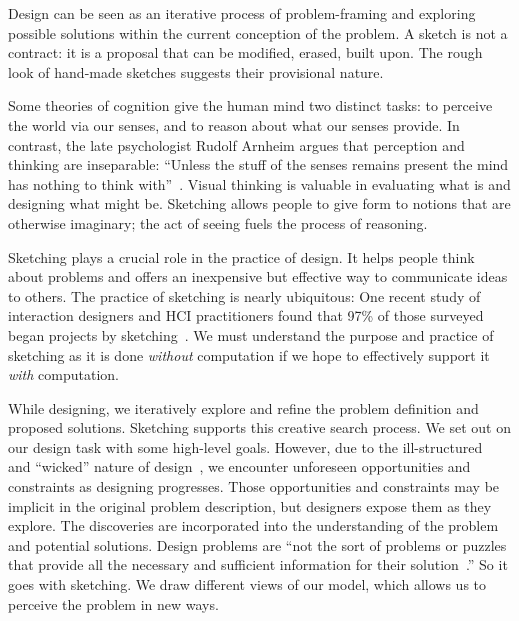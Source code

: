 Design can be seen as an iterative process of problem-framing and
exploring possible solutions within the current conception of the
problem. A sketch is not a contract: it is a proposal that can be
modified, erased, built upon. The rough look of hand-made sketches
suggests their provisional nature.

Some theories of cognition give the human mind two distinct tasks: to
perceive the world via our senses, and to reason about what our senses
provide. In contrast, the late psychologist Rudolf Arnheim argues that
perception and thinking are inseparable: ``Unless the stuff of the
senses remains present the mind has nothing to think
with''~\cite{arnheim-visthink}. Visual thinking is valuable in
evaluating what is and designing what might be. Sketching allows
people to give form to notions that are otherwise imaginary; the act
of seeing fuels the process of reasoning.

Sketching plays a crucial role in the practice of design. It helps
people think about problems and offers an inexpensive but effective
way to communicate ideas to others. The practice of sketching is
nearly ubiquitous: One recent study of interaction designers and HCI
practitioners found that 97\% of those surveyed began projects by
sketching~\cite{myers-behavior-design}. We must understand the purpose
and practice of sketching as it is done \textit{without} computation
if we hope to effectively support it \textit{with} computation.



While designing, we iteratively explore and refine the problem
definition and proposed solutions. Sketching supports this creative
search process. We set out on our design task with some high-level
goals. However, due to the
ill-structured~\cite{simon-ill-structured-problems} and ``wicked''
nature of design~\cite{rittel-wicked}, we encounter unforeseen
opportunities and constraints as designing progresses. Those
opportunities and constraints may be implicit in the original problem
description, but designers expose them as they explore. The
discoveries are incorporated into the understanding of the problem and
potential solutions. Design problems are ``not the sort of problems or
puzzles that provide all the necessary and sufficient information for
their solution~\cite{cross-nature-nurture}.'' So it goes with
sketching. We draw different views of our model, which allows us to
perceive the problem in new ways.

